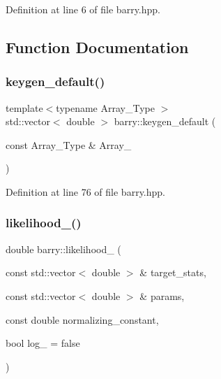 Definition at line 6 of file barry.\+hpp.



\subsection{Function Documentation}
\mbox{\label{namespacebarry_a22bfc7c4a1f5b5922edfd1101b8ffe3d}} 
\subsubsection{\texorpdfstring{keygen\+\_\+default()}{keygen\_default()}}
{\footnotesize\ttfamily template$<$typename Array\+\_\+\+Type $>$ \\
std\+::vector$<$ double $>$ barry\+::keygen\+\_\+default (\begin{DoxyParamCaption}\item[{const Array\+\_\+\+Type \&}]{Array\+\_\+ }\end{DoxyParamCaption})\hspace{0.3cm}{\ttfamily [inline]}}



Definition at line 76 of file barry.\+hpp.

\mbox{\label{namespacebarry_a1dcc0a46544cc9733ca8ee5619ef6d20}} 
\subsubsection{\texorpdfstring{likelihood\+\_\+()}{likelihood\_()}}
{\footnotesize\ttfamily double barry\+::likelihood\+\_\+ (\begin{DoxyParamCaption}\item[{const std\+::vector$<$ double $>$ \&}]{target\+\_\+stats,  }\item[{const std\+::vector$<$ double $>$ \&}]{params,  }\item[{const double}]{normalizing\+\_\+constant,  }\item[{bool}]{log\+\_\+ = {\ttfamily false} }\end{DoxyParamCaption})\hspace{0.3cm}{\ttfamily [inline]}}



